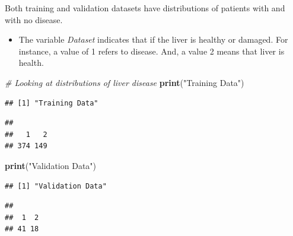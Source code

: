 \documentclass[]{article}
\newenvironment{Shaded}{\begin{snugshade}}{\end{snugshade}}
\newcommand{\CommentTok}[1]{\textcolor[rgb]{0.56,0.35,0.01}{\textit{#1}}}
\newcommand{\KeywordTok}[1]{\textcolor[rgb]{0.13,0.29,0.53}{\textbf{#1}}}
\newcommand{\NormalTok}[1]{#1}
\newcommand{\OperatorTok}[1]{\textcolor[rgb]{0.81,0.36,0.00}{\textbf{#1}}}
\newcommand{\StringTok}[1]{\textcolor[rgb]{0.31,0.60,0.02}{#1}}
\begin{document}
Both training and validation datasets have distributions of patients
with and with no disease.

\begin{itemize}
\item The variable \emph{Dataset} indicates that if the liver is healthy or damaged. For instance, a value of 1 refers to disease. And, a value 2 means that liver is health.
\end{itemize}

\begin{Shaded}
\begin{Highlighting}[]
\CommentTok{# Looking at distributions of liver disease}
\KeywordTok{print}\NormalTok{(}\StringTok{"Training Data"}\NormalTok{)}
\end{Highlighting}
\end{Shaded}

\begin{verbatim}
## [1] "Training Data"
\end{verbatim}

\begin{Shaded}
\end{Shaded}

\begin{verbatim}
## 
##   1   2 
## 374 149
\end{verbatim}

\begin{Shaded}
\begin{Highlighting}[]
\KeywordTok{print}\NormalTok{(}\StringTok{"Validation Data"}\NormalTok{)}
\end{Highlighting}
\end{Shaded}

\begin{verbatim}
## [1] "Validation Data"
\end{verbatim}

\begin{Shaded}
\end{Shaded}

\begin{verbatim}
## 
##  1  2 
## 41 18
\end{verbatim}
\end{document}
